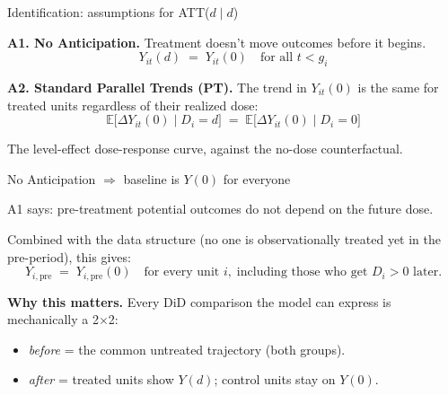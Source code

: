 \documentclass[aspectratio=169,12pt,t]{beamer}
\begin{document}
\begin{frame}{Identification: assumptions for ATT($d \mid d$)}
\vspace{0.2cm}

\textbf{A1. No Anticipation.} \;Treatment doesn't move outcomes before it begins.
\[
Y_{it}(d) \;=\; Y_{it}(0) \quad \text{for all } t < g_i
\]

\vspace{0.3cm}

\textbf{A2. Standard Parallel Trends (PT).} \;The trend in $Y_{it}(0)$ is the same for treated units regardless of their realized dose:
\[
\mathbb{E}\big[\Delta Y_{it}(0) \mid D_i = d\big] \;=\; \mathbb{E}\big[\Delta Y_{it}(0) \mid D_i = 0\big]
\]

\vspace{0.4cm}

 \;The level-effect dose-response curve, against the no-dose counterfactual.

\vspace{0.4em}
\end{frame}

\begin{frame}{No Anticipation $\Rightarrow$ baseline is $Y(0)$ for everyone}
\vspace{0.5em}

A1 says: \;pre-treatment potential outcomes do not depend on the future dose.

\vspace{0.8em}

Combined with the data structure (no one is observationally treated yet in the pre-period), this gives:
\[
Y_{i,\text{pre}} \;=\; Y_{i,\text{pre}}(0) \quad \text{for every unit } i, \;\text{including those who get } D_i > 0 \text{ later.}
\]

\vspace{0.8em}

\textbf{Why this matters.} \;Every DiD comparison the model can express is mechanically a 2$\times$2:
\begin{itemize}\setlength\itemsep{0.2em}
  \item \textit{before} = the common untreated trajectory (both groups).
  \item \textit{after} = treated units show $Y(d)$; control units stay on $Y(0)$.
\end{itemize}

\vspace{0.4em}
\begin{center}
\end{center}
\end{frame}
\end{document}
